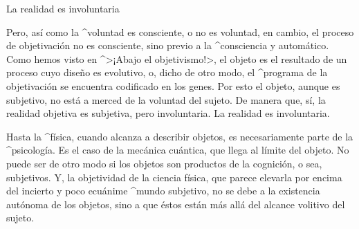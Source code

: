\Section La realidad es involuntaria

Pero, así como la ^{voluntad} es consciente, o no es voluntad, en
cambio, el proceso de objetivación no es consciente, sino previo a la
^{consciencia} y automático. Como hemos visto en ^>¡Abajo el
objetivismo!>, el objeto es el resultado de un proceso cuyo diseño es
evolutivo, o, dicho de otro modo, el ^{programa} de la objetivación se
encuentra codificado en los genes. Por esto el objeto, aunque es
subjetivo, no está a merced de la voluntad del sujeto. De manera que,
sí, la realidad objetiva es subjetiva, pero involuntaria. La realidad es
involuntaria.


Hasta la ^{física}, cuando alcanza a describir objetos, es
necesariamente parte de la ^{psicología}. Es el caso de la mecánica
cuántica, que llega al límite del objeto. No puede ser de otro modo si
los objetos son productos de la cognición, o sea, subjetivos. Y, la
objetividad de la ciencia física, que parece elevarla por encima del
incierto y poco ecuánime ^{mundo} subjetivo, no se debe a la existencia
autónoma de los objetos, sino a que éstos están más allá del alcance
volitivo del sujeto.

\endinput
